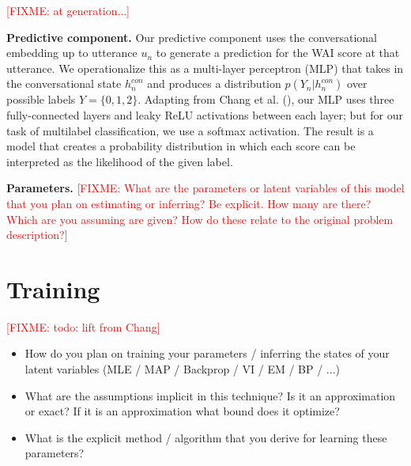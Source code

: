 \documentclass{article}
\newcommand{\fixme}[1]{\textcolor{red}{[FIXME: #1]}}
\begin{document}
\fixme{at generation...}

\textbf{Predictive component.} Our predictive component uses the conversational embedding up to utterance $u_n$ to generate a prediction for the WAI score at that utterance. We operationalize this as a multi-layer perceptron (MLP) that takes in the conversational state $h^{con}_n$ and produces a distribution $p(Y_n|h^{con}_n)$ over possible labels $Y=\{0,1,2\}$. Adapting from Chang et al. (\citeyear{Chang-Trouble:19}), our MLP uses three fully-connected layers and leaky ReLU activations between each layer; but for our task of multilabel classification, we use a softmax activation. The result is a model that creates a probability distribution in which each score can be interpreted as the likelihood of the given label.

\textbf{Parameters.} \fixme{What are the parameters or latent variables of this model that you plan on estimating or inferring? Be explicit. How many are there? Which are you assuming are given? How do these relate to the original problem description?}



\section{Training}
\label{sec:training}

\fixme{todo: lift from Chang}

\begin{itemize}
\item How do you plan on training your parameters / inferring the
  states of your latent variables (MLE / MAP / Backprop / VI / EM / BP / ...)

\item What are the assumptions implicit in this technique? Is it an approximation or exact? If it is an approximation what bound does it optimize?

\item What is the explicit method / algorithm that you derive for learning these parameters?
\end{itemize}


\end{document}
